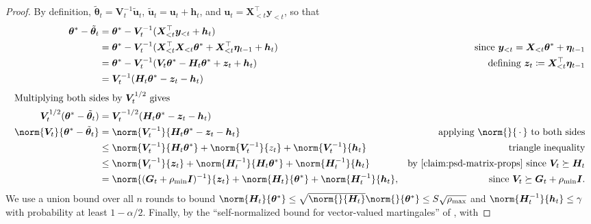 \documentclass{article}
\renewcommand{\vec}[1]{\bm{#1}}
\newcommand{\wildcard}{\mathinner{\,{\cdot}\,}}
\newcommand{\defeq}{\coloneq}
\newcommand{\inv}[1]{#1^{-1}}
\providecommand\transp{\top}
\let\transpsymbol\transp
\renewcommand{\transp}[1]{#1^\transpsymbol}
\newcommand{\Eye}[1][]{\bm{I}\notblank{#1}{_{{#1}\times{#1}}}{}}
\newcommand{\XtX}[1]{\transp{#1}{#1}}
\begin{document}
\CalcBeta*

\begin{proof}
  By definition, $\tilde{\vec\theta}_t = \inv{\vec V_t} \tilde{\vec u}_t$,
  $\tilde{\vec u}_t = \vec u_t + \vec h_t$, and $\vec u_t = \transp{\vec
    X_{<t}} \vec y_{<t}$, so that
  \begin{align*}
    \vec\theta^* - \tilde{\vec\theta}_t
    &= \vec\theta^* - \inv{\vec V_t}(\transp{\vec X_{<t}} \vec y_{<t} + \vec h_t) \\
    &= \vec\theta^* - \inv{\vec V_t}(\XtX{\vec X_{<t}} \vec\theta^*
      + \transp{\vec X_{<t}} \vec\eta_{t-1} + \vec h_t)
    &\text{since } \vec y_{<t} = \vec X_{<t} \vec\theta^* + \vec\eta_{t-1} \\
    &= \vec\theta^* - \inv{\vec V_t}(\vec V_t \vec\theta^* - \vec H_t \vec\theta^* + \vec z_t + \vec h_t)
    &\text{defining } \vec z_t \defeq \transp{\vec X_{<t}} \vec\eta_{t-1} \\
    &= \inv{\vec V_t}(\vec H_t\vec\theta^* - \vec z_t - \vec h_t) \\
    \shortintertext{Multiplying both sides by $\vec V_t^{1/2}$ gives}
    \vec V_t^{1/2}(\vec\theta^* - \tilde{\vec\theta}_t)
    &= \vec V_t^{-1/2}(\vec H_t\vec\theta^* - \vec z_t - \vec h_t) \\
    \norm{\vec V_t}{\vec\theta^* - \tilde{\vec\theta}_t}
    &= \norm{\inv{\vec V_t}}{\vec H_t\vec\theta^* - \vec z_t - \vec h_t}
    &\text{applying $\norm{}{\wildcard}$ to both sides}\\
    &\le \norm{\inv{\vec V_t}}{\vec H_t\vec\theta^*} + \norm{\inv{\vec V_t}}{z_t}
      + \norm{\inv{\vec V_t}}{\vec h_t} &\text{triangle inequality} \\
    &\le \norm{\inv{\vec V_t}}{\vec z_t} + \norm{\inv{\vec H_t}}{\vec H_t\vec\theta^*}
      + \norm{\inv{\vec H_t}}{\vec h_t}
    &\text{by \cref{claim:psd-matrix-props} since } \vec V_t \succeq \vec H_t \\
    &= \norm{\inv{(\vec G_t+\rho_{\min}\Eye)}}{\vec z_t} + \norm{\vec H_t}{\vec\theta^*} +
      \norm{\inv{\vec H_t}}{\vec h_t},
    &\text{since } \vec V_t \succeq \vec G_t + \rho_{\min}\Eye.
  \end{align*}
  We use a union bound over all $n$ rounds to bound
  $\norm{\vec H_t}{\vec\theta^*} \le
  \sqrt{\norm{}{\vec H_t}}\norm{}{\vec\theta^*} \le S\sqrt{\rho_{\max}}$
  and $\norm{\inv{\vec H_t}}{\vec h_t} \le \gamma$ with probability at
  least $1-\alpha/2$.  Finally, by the ``self-normalized bound for
  vector-valued martingales'' of
  \citet[Theorem~1]{AbbasiYadkoriImprovedAlgorithmsLinear2011}, with

\end{proof}
\end{document}
